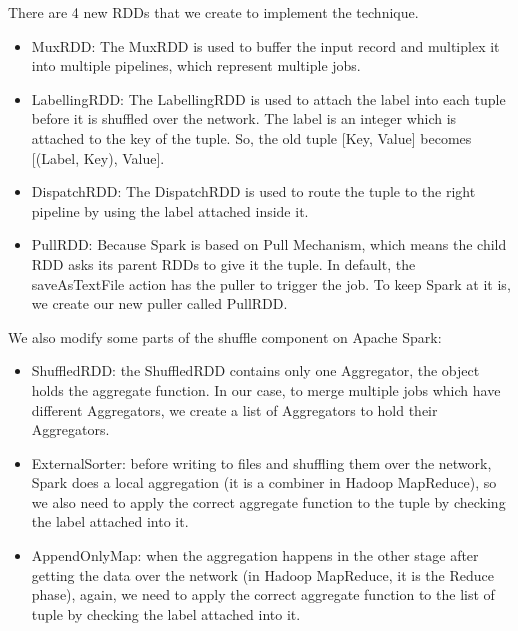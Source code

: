 There are 4 new RDDs that we create to implement the technique.
\begin{itemize}
\item MuxRDD: The MuxRDD is used to buffer the input record and multiplex it into multiple pipelines, which represent multiple jobs.
\item LabellingRDD: The LabellingRDD is used to attach the label into each tuple before it is shuffled over the network. The label is an integer which is attached to the key of the tuple. So, the old tuple [Key, Value] becomes [(Label, Key), Value].
\item DispatchRDD: The DispatchRDD is used to route the tuple to the right pipeline by using the label attached inside it.
\item PullRDD: Because Spark is based on Pull Mechanism, which means the child RDD asks its parent RDDs to give it the tuple. In default, the saveAsTextFile action has the puller to trigger the job. To keep Spark at it is, we create our new puller called PullRDD.
\end{itemize}

We also modify some parts of the shuffle component on Apache Spark:
\begin{itemize}
\item ShuffledRDD: the ShuffledRDD contains only one Aggregator, the object holds the aggregate function. In our case, to merge multiple jobs which have different Aggregators, we create a list of Aggregators to hold their Aggregators.
\item ExternalSorter: before writing to files and shuffling them over the network, Spark does a local aggregation (it is a combiner in Hadoop MapReduce), so we also need to apply the correct aggregate function to the tuple by checking the label attached into it.
\item AppendOnlyMap: when the aggregation happens in the other stage after getting the data over the network (in Hadoop MapReduce, it is the Reduce phase), again, we need to apply the correct aggregate function to the list of tuple by checking the label attached into it.
\end{itemize}

